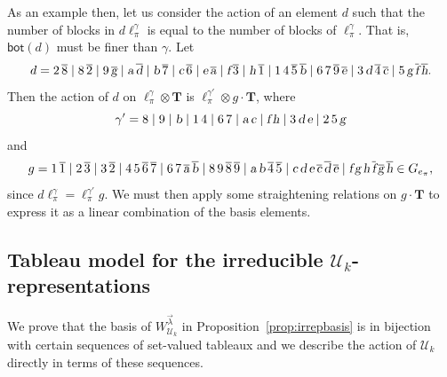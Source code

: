 \begin{example}
As an example then, let us consider the action of an element $d$ such that
the number of blocks in $d \ell^\gamma_\pi$ is equal to the number of blocks
of $\ell^\gamma_\pi$.  That is, $\mathsf{bot}(d)$ must be finer than
$\gamma$.  Let 
\begin{equation*}
   d=  2\,\overline{8} \mid
            8\,\overline{2} \mid 9\,\overline{{\textsl g}} \mid {\textsl a}\,\overline{{\textsl d}} \mid {\textsl b}\,\overline{7} \mid {\textsl c}\,\overline{6} \mid {\textsl e}\,\overline{{\textsl a}} \mid
            {\textsl f}\,\overline{3} \mid {\textsl h}\,\overline{1} \mid
            1\,4\,\overline{5}\, \overline{{\textsl b}} \mid 6\,7\,\overline{9}\,\overline{{\textsl e}} \mid 3\,{\textsl d}\,\overline{4}\, \overline{{\textsl c}} \mid 5\,{\textsl g}\,\overline{{\textsl f}}\,\overline{{\textsl h}}.
\end{equation*}
Then the action of $d$ on $\ell_\pi^\gamma \otimes \mathbf{T}$ is
$\ell^{\gamma'}_\pi \otimes g \cdot {\mathbf T}$, where
\begin{equation*}
    \gamma' =
                8 \mid
                9 \mid
                {\textsl b} \mid
                1\,4 \mid
                6\,7 \mid
                {\textsl a}\,{\textsl c} \mid
                {\textsl f}\,{\textsl h} \mid
                3\,{\textsl d}\,{\textsl e} \mid
                2\,5\,{\textsl g}
 \end{equation*}
and 
\begin{equation*}
     g=1\, \overline{1} \mid
        2\, \overline{3} \mid
        3\, \overline{2} \mid
        4\,5\,\overline{6}\,\overline{7} \mid
        6\,7\,\overline{{\textsl a}}\,\overline{{\textsl b}} \mid
        8\,9\,\overline{8}\,\overline{9} \mid
        {\textsl a}\,{\textsl b}\,\overline{4}\,\overline{5} \mid
        {\textsl c}\,{\textsl d}\,{\textsl e}\,\overline{{\textsl c}}\,\overline{{\textsl d}}\,\overline{{\textsl e}} \mid
        {\textsl f}\,{\textsl g}\,{\textsl h}\,\overline{{\textsl f}}\,\overline{{\textsl g}}\,\overline{{\textsl h}}\in G_{e_\pi}, 
\end{equation*}
since $d \ell_\pi^\gamma = \ell_\pi^{\gamma'} g$. We must then
apply some straightening relations on $g \cdot \mathbf{T}$ to express it as
a linear combination of the basis elements.
\end{example}


\subsection{Tableau model for the irreducible $\mathcal{U}_k$-representations}
\label{sec:irreps-of-UBP-algebra-2}
We prove that the basis of $W_{\mathcal{U}_k}^{\vec{\lambda}}$ in
Proposition~\ref{prop:irrepbasis} is in bijection with certain sequences of
set-valued tableaux and we describe the action of $\mathcal{U}_k$ directly in
terms of these sequences.

